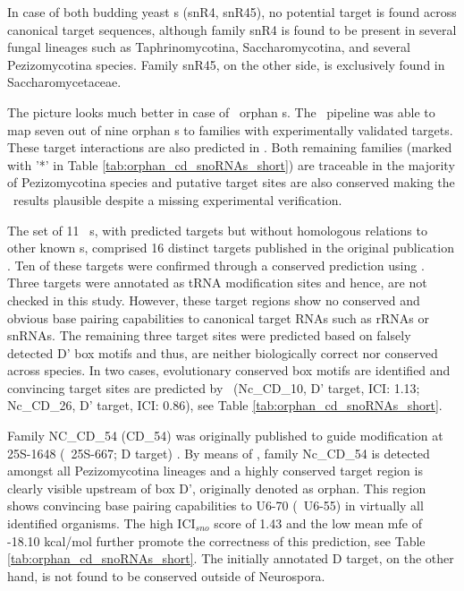 In case of both budding yeast \sno s (snR4, snR45), no potential target is found
across canonical target sequences, although family snR4 is found to be
present in several fungal lineages such as Taphrinomycotina,
Saccharomycotina, and several Pezizomycotina species. Family snR45, on
the other side, is exclusively found in Saccharomycetaceae.

The picture looks much better in case of \afu\ orphan \sno s. The
\snostrip\ pipeline was able to map seven out of nine orphan \cd s
to families with experimentally validated targets. These target
interactions are also predicted in \afu. Both remaining families
(marked with '*' in Table \ref{tab:orphan_cd_snoRNAs_short}) are
traceable in the majority of Pezizomycotina species and putative
target sites are also conserved making the \snostrip\ results
plausible despite a missing experimental verification.

The set of 11 \ncr\ \sno s, with predicted targets but without homologous
relations to other known \sno s,
comprised 16 distinct targets published in the original publication \cite{Li:2005}.
Ten of these targets were confirmed through a conserved prediction using \snostrip.
Three targets were annotated as tRNA modification
sites and hence, are not checked in this study. However, these target
regions show no conserved and obvious base pairing capabilities to
canonical target RNAs such as rRNAs or snRNAs. The remaining three
target sites were predicted based on falsely detected D' box
motifs and thus, are neither biologically correct nor conserved across
species. In two cases, evolutionary conserved box motifs are
identified and convincing target sites are predicted by \snostrip\
(Nc\_CD\_10, D' target, ICI: 1.13; Nc\_CD\_26, D' target, ICI: 0.86), see Table
\ref{tab:orphan_cd_snoRNAs_short}.

Family NC\_CD\_54 (CD\_54) was originally published to guide modification at
25S-1648 (\ncr\ 25S-667; D target) \cite{Liu:2009}. By means of
\snostrip, family Nc\_CD\_54 is detected amongst all Pezizomycotina lineages and a
highly conserved target region is clearly
visible upstream of box D', originally denoted as orphan. This region shows convincing base pairing capabilities to
U6-70 (\ncr\ U6-55) in virtually all identified organisms. The high
ICI$_{sno}$ score of 1.43 and the low mean mfe of -18.10 kcal/mol
further promote the correctness of this prediction, see Table
\ref{tab:orphan_cd_snoRNAs_short}. The initially
annotated D target, on the other hand, is not found to be conserved outside of Neurospora.\\

